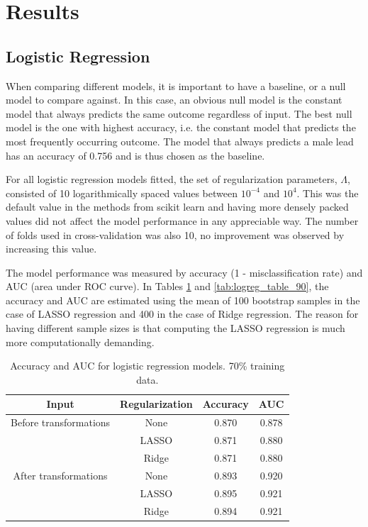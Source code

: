 \documentclass{article}
\begin{document}
\section{Results}

\subsection{Logistic Regression}

When comparing different models, it is important to have a baseline, or a null model to compare against. In this case, an obvious null model is the constant model that always predicts the same outcome regardless of input. The best null model is the one with highest accuracy, i.e. the constant model that predicts the most frequently occurring outcome. The model that always predicts a male lead has an accuracy of 0.756 and is thus chosen as the baseline.

For all logistic regression models fitted, the set of regularization parameters, $\Lambda$, consisted of 10 logarithmically spaced values between $10^{-4}$ and $10^4$. This was the default value in the methods from scikit learn and having more densely packed values did not affect the model performance in any appreciable way. The number of folds used in cross-validation was also 10, no improvement was observed by increasing this value.

The model performance was measured by accuracy (1 - misclassification rate) and AUC (area under ROC curve). In Tables \ref{tab:logreg_table_70} and \ref{tab:logreg_table_90}, the accuracy and AUC are estimated using the mean of 100 bootstrap samples in the case of LASSO regression and 400 in the case of Ridge regression. The reason for having different sample sizes is that computing the LASSO regression is much more computationally demanding.

\begin{table}[h!]
	\centering
	\begin{tabular}{cccc}
		Input & Regularization & Accuracy & AUC \\
		\midrule
		Before transformations & None & 0.870 & 0.878 \\
		& LASSO & 0.871 & 0.880 \\
		& Ridge & 0.871 & 0.880 \\
		\midrule
		After transformations & None & 0.893 & 0.920 \\
		& LASSO & 0.895 & 0.921 \\
		& Ridge & 0.894 & 0.921 \\
	\end{tabular}
	\caption{Accuracy and AUC for logistic regression models. 70\% training data.}
	\label{tab:logreg_table_70}
\end{table}
\end{document}
